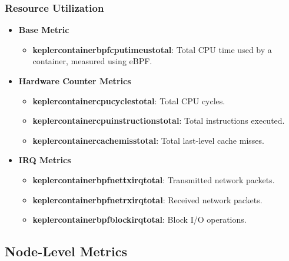 \subsubsection{Resource Utilization}
\begin{itemize}
    \item \textbf{Base Metric}
    \begin{itemize}
        \item \textbf{kepler\textunderscore container\textunderscore bpf\textunderscore cpu\textunderscore time\textunderscore us\textunderscore total}: Total CPU time used by a container, measured using eBPF.
    \end{itemize}
    \item \textbf{Hardware Counter Metrics}
    \begin{itemize}
        \item \textbf{kepler\textunderscore container\textunderscore cpu\textunderscore cycles\textunderscore total}: Total CPU cycles.
        \item \textbf{kepler\textunderscore container\textunderscore cpu\textunderscore instructions\textunderscore total}: Total instructions executed.
        \item \textbf{kepler\textunderscore container\textunderscore cache\textunderscore miss\textunderscore total}: Total last-level cache misses.
    \end{itemize}
    \item \textbf{IRQ Metrics}
    \begin{itemize}
        \item \textbf{kepler\textunderscore container\textunderscore bpf\textunderscore net\textunderscore tx\textunderscore irq\textunderscore total}: Transmitted network packets.
        \item \textbf{kepler\textunderscore container\textunderscore bpf\textunderscore net\textunderscore rx\textunderscore irq\textunderscore total}: Received network packets.
        \item \textbf{kepler\textunderscore container\textunderscore bpf\textunderscore block\textunderscore irq\textunderscore total}: Block I/O operations.
    \end{itemize}
\end{itemize}

\subsection{Node-Level Metrics}

